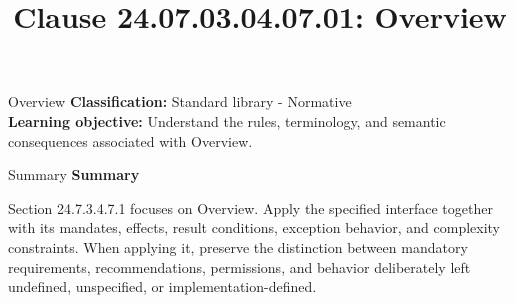 \documentclass[10pt,letterpaper]{article}
\title{Clause 24.07.03.04.07.01: Overview}
\author{}
\date{}
\begin{document}
\maketitle
\begin{CornellOverviewBox}{Overview}
\textbf{Classification:} Standard library - Normative\\[2pt]
\textbf{Learning objective:} Understand the rules, terminology, and semantic consequences associated with Overview.
\end{CornellOverviewBox}\begin{CornellSummaryBox}{Summary}
{\sffamily\bfseries\color{Accent} Summary}\par\vspace{3pt}Section 24.7.3.4.7.1 focuses on Overview. Apply the specified interface together with its mandates, effects, result conditions, exception behavior, and complexity constraints. When applying it, preserve the distinction between mandatory requirements, recommendations, permissions, and behavior deliberately left undefined, unspecified, or implementation-defined.
\end{CornellSummaryBox}
\end{document}
